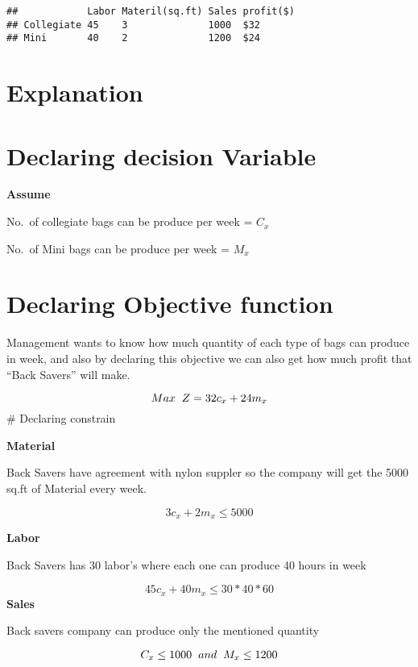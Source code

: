 \documentclass[
]{article}
\begin{document}
\begin{verbatim}
##            Labor Materil(sq.ft) Sales profit($)
## Collegiate 45    3              1000  $32      
## Mini       40    2              1200  $24
\end{verbatim}

\hypertarget{explanation}{%
\section{Explanation}\label{explanation}}

\hypertarget{declaring-decision-variable}{%
\section{Declaring decision
Variable}\label{declaring-decision-variable}}

\textbf{Assume}

No.~of collegiate bags can be produce per week = \(C_x\)

No.~of Mini bags can be produce per week = \(M_x\)

\hypertarget{declaring-objective-function}{%
\section{Declaring Objective
function}\label{declaring-objective-function}}

Management wants to know how much quantity of each type of bags can
produce in week, and also by declaring this objective we can also get
how much profit that ``Back Savers'' will make.

\[ Max \hspace{.2cm} Z = 32c_x+24m_x \] \# Declaring constrain

\textbf{Material}

Back Savers have agreement with nylon suppler so the company will get
the 5000 sq.ft of Material every week.

\[ 3c_x+2m_x \le 5000 \]

\textbf{Labor}

Back Savers has 30 labor's where each one can produce 40 hours in week

\[ 45c_x+40m_x \le 30*40*60 \] \textbf{Sales}

Back savers company can produce only the mentioned quantity

\[C_x \le 1000 \hspace{.2cm} and \hspace{.2cm}M_x \le 1200 \]
\end{document}
